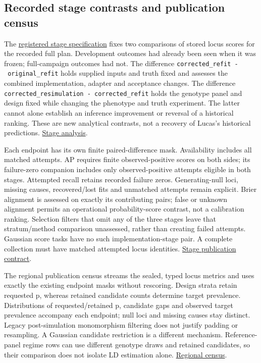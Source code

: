 \documentclass[
  british,
  10pt,
]{article}
\begin{document}
\subsection{Recorded stage contrasts and publication
census}\label{recorded-stage-contrasts-and-publication-census}

The \href{stage-attribution-spec.json}{registered stage specification}
fixes two comparisons of stored locus scores for the recorded full plan.
Development outcomes had already been seen when it was frozen;
full-campaign outcomes had not. The difference
\texttt{corrected\_refit\ -\ original\_refit} holds supplied inputs and
truth fixed and assesses the combined implementation, adapter and
acceptance changes. The difference
\texttt{corrected\_resimulation\ -\ corrected\_refit} holds the genotype
panel and design fixed while changing the phenotype and truth
experiment. The latter cannot alone establish an inference improvement
or reversal of a historical ranking. These are new analytical contrasts,
not a recovery of Lucas's historical predictions.
\href{stage_attribution.R}{Stage analysis}.

Each endpoint has its own finite paired-difference mask. Availability
includes all matched attempts. AP requires finite observed-positive
scores on both sides; its failure-zero companion includes only
observed-positive attempts eligible in both stages. Attempted recall
retains recorded failure zeros. Generating-null loci, missing causes,
recovered/lost fits and unmatched attempts remain explicit. Brier
alignment is assessed on exactly its contributing pairs; false or
unknown alignment permits an operational probability-score contrast, not
a calibration ranking. Selection filters that omit any of the three
stages leave that stratum/method comparison unassessed, rather than
creating failed attempts. Gaussian score tasks have no such
implementation-stage pair. A complete collection must have matched
attempted locus identities. \href{stage_publication.R}{Stage publication
contract}.

The regional publication census streams the sealed, typed locus metrics
and uses exactly the existing endpoint masks without rescoring. Design
strata retain requested p, whereas retained candidate counts determine
target prevalence. Distributions of requested/retained p, candidate gaps
and observed target prevalence accompany each endpoint; null loci and
missing causes stay distinct. Legacy post-simulation monomorphism
filtering does not justify padding or resampling. A Gaussian candidate
restriction is a different mechanism. Reference-panel regime rows can
use different genotype draws and retained candidates, so their
comparison does not isolate LD estimation alone.
\href{regional_publication.R}{Regional census}.
\end{document}
